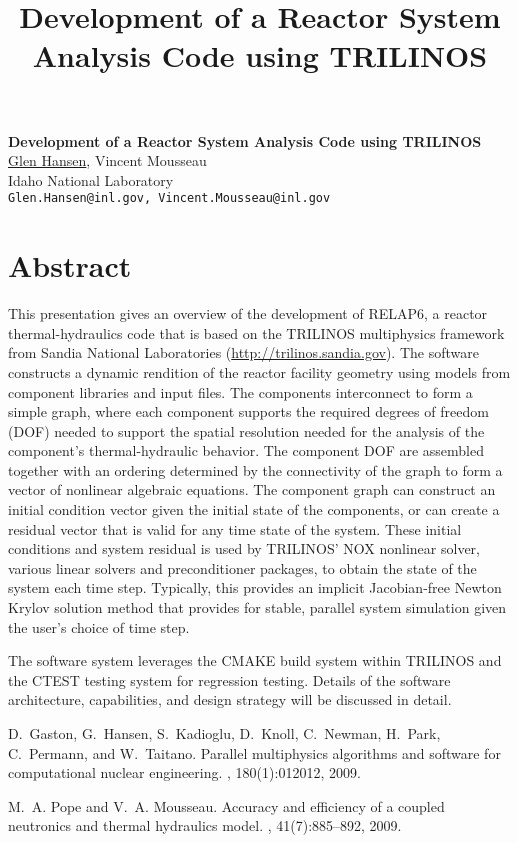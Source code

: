 \title{Development of a Reactor System Analysis Code using TRILINOS}
\author{} \institute{}

\begin{center}

\textbf{\Large Development of a Reactor System Analysis Code using TRILINOS}\\
\vspace{10mm}
{\large \underline{Glen Hansen}, Vincent Mousseau}\\
Idaho National Laboratory\\
{\tt Glen.Hansen@inl.gov, Vincent.Mousseau@inl.gov}

\end{center}

\section*{Abstract}

This presentation gives an overview of the development of RELAP6, a reactor thermal-hydraulics code that is based on the TRILINOS multiphysics framework from Sandia National Laboratories (\url{http://trilinos.sandia.gov}). The software constructs a dynamic rendition of the reactor facility geometry using models from component libraries and input files. The components interconnect to form a simple graph, where each component supports the required degrees of freedom (DOF) needed to support the spatial resolution needed for the analysis of the component's thermal-hydraulic behavior. The component DOF are assembled together with an ordering determined by the connectivity of the graph to form a vector of nonlinear algebraic equations.  The component graph can construct an initial condition vector given the initial state of the components, or can create a residual vector that is valid for any time state of the system. These initial conditions and system residual is used by TRILINOS' NOX nonlinear solver, various linear solvers and preconditioner packages, to obtain the state of the system each time step. Typically, this provides an implicit Jacobian-free Newton Krylov solution method that provides for stable, parallel system simulation given the user's choice of time step.

The software system leverages the CMAKE build system within TRILINOS and the CTEST testing system for regression testing. Details of the software architecture, capabilities, and design strategy will be discussed in detail.


\begin{thebibliography}{1}

D.~Gaston, G.~Hansen, S.~Kadioglu, D.~Knoll, C.~Newman, H.~Park, C.~Permann, and W.~Taitano.
\newblock Parallel multiphysics algorithms and software for computational nuclear engineering.
, 180(1):012012, 2009.

M.~A. Pope and V.~A. Mousseau.
\newblock Accuracy and efficiency of a coupled neutronics and thermal hydraulics model.
, 41(7):885--892, 2009.

\end{thebibliography}